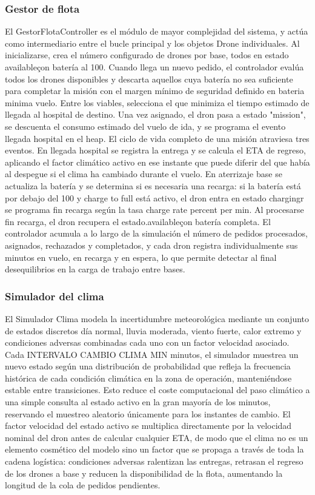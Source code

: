 \documentclass[11pt, a4paper]{article} %
\begin{document}
\subsubsection{Gestor de flota}
El GestorFlotaController es el módulo de mayor complejidad del sistema, y actúa como intermediario entre el bucle principal y los objetos Drone individuales. Al inicializarse, crea el número configurado de drones por base, todos en estado availableçon batería al 100. Cuando llega un nuevo pedido, el controlador evalúa todos los drones disponibles y descarta aquellos cuya batería no sea suficiente para completar la misión con el margen mínimo de seguridad definido en bateria minima vuelo. Entre los viables, selecciona el que minimiza el tiempo estimado de llegada al hospital de destino. Una vez asignado, el dron pasa a estado "mission", se descuenta el consumo estimado del vuelo de ida, y se programa el evento llegada hospital en el heap. El ciclo de vida completo de una misión atraviesa tres eventos. En llegada hospital se registra la entrega y se calcula el ETA de regreso, aplicando el factor climático activo en ese instante que puede diferir del que había al despegue si el clima ha cambiado durante el vuelo. En aterrizaje base se actualiza la batería y se determina si es necesaria una recarga: si la batería está por debajo del 100 y charge to full está activo, el dron entra en estado chargingr se programa fin recarga según la tasa charge rate percent per min. Al procesarse fin recarga, el dron recupera el estado.availableçon batería completa. El controlador acumula a lo largo de la simulación el número de pedidos procesados, asignados, rechazados y completados, y cada dron registra individualmente sus minutos en vuelo, en recarga y en espera, lo que permite detectar al final desequilibrios en la carga de trabajo entre bases.

\subsubsection{Simulador del clima}
El Simulador Clima modela la incertidumbre meteorológica mediante un conjunto de estados discretos día normal, lluvia moderada, viento fuerte, calor extremo y condiciones adversas combinadas cada uno con un factor velocidad asociado. Cada INTERVALO CAMBIO CLIMA MIN minutos, el simulador muestrea un nuevo estado según una distribución de probabilidad que refleja la frecuencia histórica de cada condición climática en la zona de operación, manteniéndose estable entre transiciones. Esto reduce el coste computacional del paso climático a una simple consulta al estado activo en la gran mayoría de los minutos, reservando el muestreo aleatorio únicamente para los instantes de cambio. El factor velocidad del estado activo se multiplica directamente por la velocidad nominal del dron antes de calcular cualquier ETA, de modo que el clima no es un elemento cosmético del modelo sino un factor que se propaga a través de toda la cadena logística: condiciones adversas ralentizan las entregas, retrasan el regreso de los drones a base y reducen la disponibilidad de la flota, aumentando la longitud de la cola de pedidos pendientes.
\end{document}
